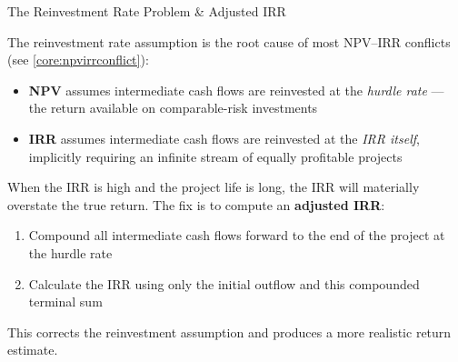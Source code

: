 \documentclass[10pt]{article}
\begin{document}
    \begin{core}{The Reinvestment Rate Problem \& Adjusted IRR}

      The reinvestment rate assumption is the root cause of most NPV--IRR conflicts (see \autoref{core:npvirrconflict}):

      \begin{itemize}

        \item \textbf{NPV} assumes intermediate cash flows are reinvested at the \textit{hurdle rate} — the return available on comparable-risk investments

        \item \textbf{IRR} assumes intermediate cash flows are reinvested at the \textit{IRR itself}, implicitly requiring an infinite stream of equally profitable projects

      \end{itemize}

      When the IRR is high and the project life is long, the IRR will materially overstate the true return. The fix is to compute an \textbf{adjusted IRR}:

      \begin{enumerate}

        \item Compound all intermediate cash flows forward to the end of the project at the hurdle rate

        \item Calculate the IRR using only the initial outflow and this compounded terminal sum

      \end{enumerate}

      This corrects the reinvestment assumption and produces a more realistic return estimate.


    \end{core}
\end{document}
